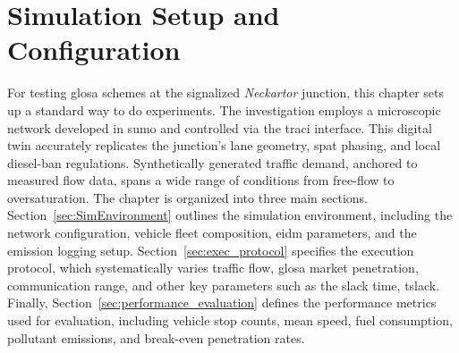 \chapter{Simulation Setup and Configuration}
\label{ch:SimulationSetupConfiguration}

For testing \ac{glosa} schemes at the signalized \emph{Neckartor} junction, this chapter sets up a standard way to do experiments. The investigation employs a microscopic network developed in \ac{sumo} and controlled via the \ac{traci} interface. This digital twin accurately replicates the junction's lane geometry, \ac{spat} phasing, and local diesel-ban regulations. Synthetically generated traffic demand, anchored to measured flow data, spans a wide range of conditions from free-flow to oversaturation.
\mynewline
The chapter is organized into three main sections. Section~\ref{sec:SimEnvironment} outlines the simulation environment, including the network configuration, vehicle fleet composition, \ac{eidm} parameters, and the emission logging setup. Section~\ref{sec:exec_protocol} specifies the execution protocol, which systematically varies traffic flow, \ac{glosa} market penetration, communication range, and other key parameters such as the slack time, \gls{tslack}. Finally, Section~\ref{sec:performance_evaluation} defines the performance metrics used for evaluation, including vehicle stop counts, mean speed, fuel consumption, pollutant emissions, and break-even penetration rates.





